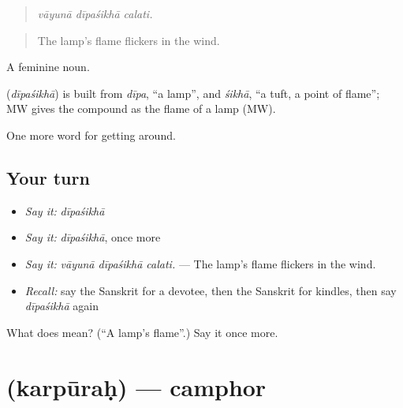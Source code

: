 \begin{quote}
  
\end{quote}

\begin{quote}
\emph{vāyunā dīpaśikhā calati.}
\end{quote}

\begin{quote}
The lamp's flame flickers in the wind.
\end{quote}

A feminine noun.

\begin{cousinweb}
\textbf{} (\emph{dīpaśikhā}) is built from \emph{dīpa}, \textquotedblleft{}a lamp\textquotedblright{}, and \emph{śikhā}, \textquotedblleft{}a tuft, a point of flame\textquotedblright{}; MW gives the compound as the flame of a lamp (MW).
\end{cousinweb}

\begin{grammarlens}[title={What you've built}]
One more word for getting around.
\end{grammarlens}

\subsection*{Your turn}
\begin{itemize}
\raggedright
  \item \emph{Say it:} \emph{dīpaśikhā}
  \item \emph{Say it:} \emph{dīpaśikhā}, once more
  \item \emph{Say it:} \emph{vāyunā dīpaśikhā calati.} — The lamp's flame flickers in the wind.
  \item \emph{Recall:} say the Sanskrit for a devotee, then the Sanskrit for kindles, then say \emph{dīpaśikhā} again
\end{itemize}

\begin{tcolorbox}[breakable,colback=teal!4,colframe=teal!35!black,title={Before you move on}]
What does  mean? (\textquotedblleft{}A lamp's flame\textquotedblright{}.) Say it once more.
\end{tcolorbox}
\section[\texorpdfstring{\sk{कर्पूरः} (karpūraḥ)}{कर्पूरः (karpūraḥ)}]{ (karpūraḥ) — camphor}

